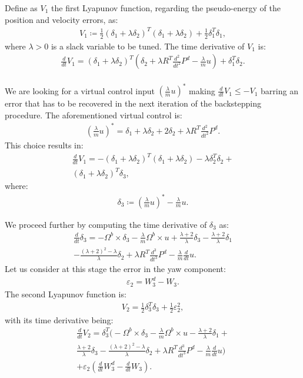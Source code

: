 Define as $V_1$ the first Lyapunov function, regarding the pseudo-energy of the position and velocity errors, as:
\begin{align*}
    V_1 \coloneq \frac{1}{2}(\delta_1+\lambda \delta_2)^T(\delta_1+\lambda \delta_2)+\frac{1}{2}\delta_1^T\delta_1,
\end{align*}
where $\lambda>0$ is a slack variable to be tuned. The time derivative of $V_1$ is:
\begin{align*}
    \frac{d}{dt}V_1 = (\delta_1+\lambda \delta_2)^T \left( \delta_2+\lambda R^T \frac{d^2}{dt^2}P^d-\frac{\lambda}{m}u \right)+\delta_1^T \delta_2.
\end{align*} \\
We are looking for a virtual control input $(\frac{\lambda}{m}u)^*$ making $\frac{d}{dt}V_1 \leq -V_1$ barring an error that has to be recovered in the next iteration of the backstepping procedure. The aforementioned virtual control is:
\begin{align*}
    \left( \frac{\lambda}{m}u \right)^* = \delta_1+\lambda \delta_2+2\delta_2+\lambda R^T \frac{d^2}{dt^2}P^d.
\end{align*}
This choice results in:
\begin{gather*}
    \frac{d}{dt}V_1 = -(\delta_1+\lambda \delta_2)^T(\delta_1+\lambda \delta_2)-\lambda \delta_2^T \delta_2 + \\
    (\delta_1+\lambda \delta_2)^T \delta_3,
\end{gather*}
where:
\begin{align*}
    \delta_3 \coloneq \left( \frac{\lambda}{m}u \right)^*-\frac{\lambda}{m}u.
\end{align*}

We proceed further by computing the time derivative of $\delta_3$ as:
\begin{gather*}
    \frac{d}{dt}\delta_3 = -\Omega^b \times \delta_3 -\frac{\lambda}{m}\Omega^b \times u+\frac{\lambda+2}{\lambda}\delta_3-\frac{\lambda+2}{\lambda}\delta_1 \\
    -\frac{(\lambda+2)^2-\lambda}{\lambda}\delta_2+\lambda R^T \frac{d^3}{dt^3}P^d-\frac{\lambda}{m}\frac{d}{dt}u.
\end{gather*}
Let us consider at this stage the error in the yaw component:
\begin{align*}
    \varepsilon_2 = W_3^d-W_3.
\end{align*}
The second Lyapunov function is:
\begin{align*}
    V_2 = \frac{1}{2}\delta_3^T\delta_3+\frac{1}{2}\varepsilon_2^2,
\end{align*}
with its time derivative being:
\begin{gather*}
    \frac{d}{dt}V_2 = \delta_3^T \bigg( -\Omega^b \times \delta_3-\frac{\lambda}{m}\Omega^b \times u - \frac{\lambda+2}{\lambda}\delta_1 + \\
    \frac{\lambda+2}{\lambda}\delta_3 - \frac{(\lambda +2)^2 - \lambda}{\lambda} \delta_2 + \lambda R^T \frac{d^3}{dt^3}P^d - \frac{\lambda}{m} \frac{d}{dt} u \bigg) \\
    + \varepsilon_2 \left( \frac{d}{dt}{W_3^d}-\frac{d}{dt}W_3 \right).
\end{gather*}

